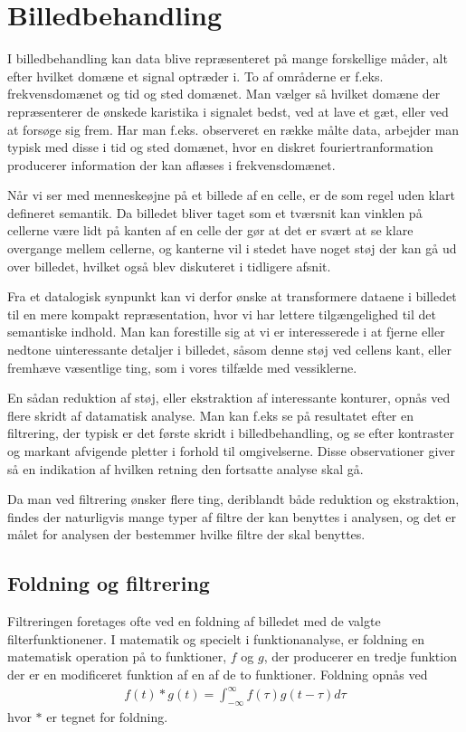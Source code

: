 \thispagestyle{plain}
\section{Billedbehandling}
\pagestyle{headings}
I billedbehandling kan data blive repræsenteret på mange forskellige måder, alt efter hvilket domæne et signal optræder i. To af områderne er f.eks. frekvensdomænet og tid og sted domænet. Man vælger så hvilket domæne der repræsenterer de ønskede karistika i signalet bedst, ved at lave et gæt, eller ved at forsøge sig frem. Har man f.eks. observeret en række målte data, arbejder man typisk med disse i tid og sted domænet, hvor en diskret fouriertranformation producerer information der kan aflæses i frekvensdomænet. 

Når vi ser med menneskeøjne på et billede af en celle, er de som regel uden klart defineret semantik. Da billedet bliver taget som et tværsnit kan vinklen på cellerne være lidt på kanten af en celle der gør at det er svært at se klare overgange mellem cellerne, og kanterne vil i stedet have noget støj der kan gå ud over billedet, hvilket også blev diskuteret i tidligere afsnit.

Fra et datalogisk synpunkt kan vi derfor ønske at transformere dataene i billedet til en mere kompakt repræsentation, hvor vi har lettere tilgængelighed til det semantiske indhold. Man kan forestille sig at vi er interesserede i at fjerne eller nedtone uinteressante detaljer i billedet, såsom denne støj ved cellens kant, eller fremhæve væsentlige ting, som i vores tilfælde med vessiklerne. 

En sådan reduktion af støj, eller ekstraktion af interessante konturer, opnås ved flere skridt af datamatisk analyse. Man kan f.eks se på resultatet efter en filtrering, der typisk er det første skridt i billedbehandling, og se efter kontraster og markant afvigende pletter i forhold til omgivelserne. Disse observationer giver så en indikation af hvilken retning den fortsatte analyse skal gå.

Da man ved filtrering ønsker flere ting, deriblandt både reduktion og ekstraktion, findes der naturligvis mange typer af filtre der kan benyttes i analysen, og det er målet for analysen der bestemmer hvilke filtre der skal benyttes. 

\subsection{Foldning og filtrering}
Filtreringen foretages ofte ved en foldning af billedet med de valgte filterfunktionener. I matematik og specielt i funktionanalyse, er foldning en matematisk operation på to funktioner, $f$ og $g$, der producerer en tredje funktion der er en modificeret funktion af en af de to funktioner. Foldning opnås ved
\begin{align}
	f(t)*g(t)=\int_{-\infty}^{\infty}f(\tau)g(t-\tau)d\tau
\end{align}
hvor $*$ er tegnet for foldning. 


